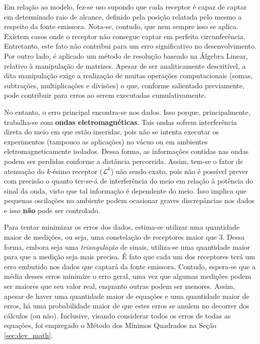 	Em relação ao modelo, fez-se uso supondo que cada receptor é capaz de captar em determinado raio de alcance, definido pela
	posição relatada pelo mesmo a respeito da fonte emissora. Nota-se, contudo, que nem sempre isso se aplica. Existem casos
	onde o receptor não consegue captar em perfeita circunferência. Entretanto, este fato não contribui para um erro significativo
	no desenvolvimento. Por outro lado, é aplicado um método de resolução baseado na Álgebra Linear, relativo à manipulação de matrizes. Apesar
	de ser analiticamente descritível, a dita manipulação exige a realização de muitas operações computacionais (somas, subtrações,
	multiplicações e divisões) o que, conforme salientado previamente, pode contribuir para erros ao serem executadas cumulativamente.

	No entanto, o erro principal encontra-se nos dados. Isso porque, principalmente, trabalha-se com \textbf{ondas eletromagnéticas}. Tais
	ondas sofrem interferência direta do meio em que estão inseridas, pois não se intenta executar os experimentos (tampouco as aplicações)
	no vácuo ou em ambientes eletromagneticamente isolados. Dessa forma, as informações contidas nas ondas podem ser perdidas conforme a distância
	percorrida. Assim, tem-se o fator de atenuação do $k$-ésimo receptor ($\mathcal{L}^k$) não sendo exato, pois não é possível prever com precisão
	o quanto ter-se-á de interferência do meio em relação à potência do sinal da onda, visto que tal informação é dependente do meio. Isso implica
	que pequenas oscilações no ambiente podem ocasionar graves discrepâncias nos dados e isso \textbf{não} pode ser controlado.

	Para tentar minimizar os erros dos dados, estima-se utilizar uma quantidade maior de medições, ou seja, uma constelação de receptores maior que $3$.
	Dessa forma, embora seja uma \textit{triangulação} de sinais, utiliza-se uma quantidade maior para que a medição seja mais precisa. É fato que
	cada um dos receptores terá um erro embutido nos dados que captará da fonte emissora. Contudo, espera-se que a média desses erros minimize o erro geral,
	uma vez que algumas medições podem ser maiores que seu valor real, enquanto outras podem ser menores. Assim, apesar de haver uma quantidade maior
	de equações e uma quantidade maior de erros, há uma probabilidade maior de que estes erros se anulem no decorrer dos cálculos (ou não).
	Inclusive, visando considerar todos os erros de todas as equações, foi empregado o Método dos Mínimos Quadrados na Seção \ref{sec:dev_math}.

